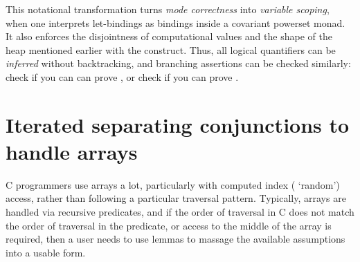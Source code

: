 This notational transformation turns \emph{mode correctness} into
\emph{variable scoping}, when one interprets let-bindings  as  bindings inside a covariant powerset monad. It also enforces the
disjointness of computational values and the shape of the heap mentioned
earlier with the 
construct. Thus, all logical quantifiers can be \emph{inferred} without
backtracking, and branching assertions can be checked similarly:
check  if you can can prove , or check  if you can prove .

\section{Iterated separating conjunctions to handle arrays}\label{sec:it-array}

C programmers use arrays a lot, particularly with computed index (\ie{}
`random') access, rather than following a particular traversal pattern.
Typically, arrays are handled via recursive predicates, and if the order of
traversal in C does not match the order of traversal in the predicate, or
access to the middle of the array is required, then a user needs to use lemmas
to massage the available assumptions into a usable form.

